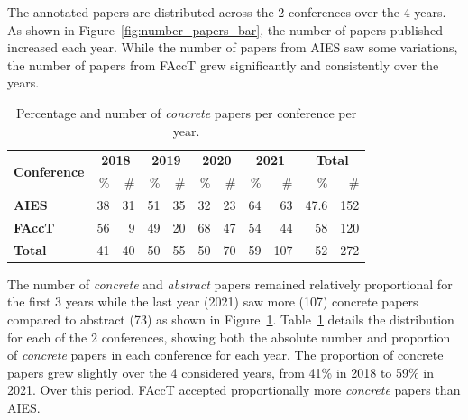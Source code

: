 \documentclass[manuscript]{acmart}
\begin{document}
\begin{figure}[htbp]
\begin{minipage}{.45\textwidth}
        \label{fig:concrete_abstract_year}
    \end{minipage}%
\end{figure}

The annotated papers are distributed across the 2 conferences over the 4 years. %
As shown in Figure~\ref{fig:number_papers_bar}, the number of papers published increased each year. %
While the number of papers from AIES saw some variations, the number of papers from FAccT grew significantly and consistently over the years.

\begin{table}[htbp]
    \centering
    \caption{Percentage and number of \textit{concrete} papers per conference per year.}
    \label{tab:concrete_summary}
    \begin{tabular}{lrrrrrrrrrr}
        \toprule
        \multirow{2}{*}{\textbf{Conference}} & \multicolumn{2}{c}{\textbf{2018}} & \multicolumn{2}{c}{\textbf{2019}} & \multicolumn{2}{c}{\textbf{2020}} &
        \multicolumn{2}{c}{\textbf{2021}} &
        \multicolumn{2}{c}{\textbf{Total}} \\ 
        \cmidrule(lr){2-3}\cmidrule(lr){4-5}\cmidrule(lr){6-7}\cmidrule(lr){8-9}\cmidrule(lr){10-11}
        & \% & \# & \% & \# & \% & \# & \% & \# & \% & \#\\
        \midrule
        \textbf{AIES} & 38 & 31 & 51 & 35 & 32 & 23 & 64 & 63 & 47.6 & 152\\
        \textbf{FAccT} & 56 & 9 & 49 & 20 & 68 & 47 & 54 & 44 & 58 & 120\\
        \textbf{Total} & 41 & 40 & 50 & 55 & 50 & 70 & 59 & 107 & 52 & 272\\
    \bottomrule
    \end{tabular}
\end{table}


The number of \textit{concrete} and \textit{abstract} papers remained relatively proportional for the first 3 years while the last year (2021) saw more (107) concrete papers compared to abstract (73) as shown in Figure~\ref{fig:concrete_abstract_year}. Table~\ref{tab:concrete_summary} details the distribution for each of the 2 conferences, showing both the absolute number and proportion of \textit{concrete} papers in each conference for each year. The proportion of concrete papers grew slightly over the 4 considered years, from 41\% in 2018 to 59\% in 2021. Over this period, FAccT accepted proportionally more \textit{concrete} papers than AIES.
\end{document}
